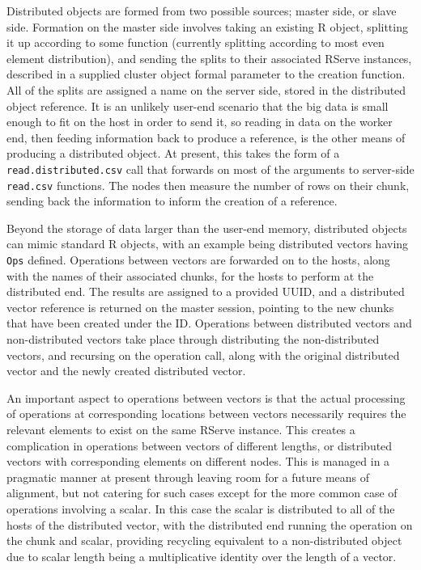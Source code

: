 \documentclass[a4paper,10pt]{article}
\begin{document}
Distributed objects are formed from two possible sources; master side, or slave
side.  
Formation on the master side involves taking an existing R object,
splitting it up according to some function (currently splitting according to
most even element distribution), and sending the splits to their associated
RServe instances, described in a supplied cluster object formal parameter to
the creation function.  
All of the splits are assigned a name on the server side, stored in the
distributed object reference.  
It is an unlikely user-end scenario that the big data is small enough to fit on
the host in order to send it, so reading in data on the worker end, then
feeding information back to produce a reference, is the other means of
producing a distributed object.  
At present, this takes the form of a \texttt{read.distributed.csv} call that
forwards on most of the arguments to server-side \texttt{read.csv} functions.
The nodes then measure the number of rows on their chunk, sending back the
information to inform the creation of a reference.

Beyond the storage of data larger than the user-end memory, distributed objects
can mimic standard R objects, with an example being distributed vectors having
\texttt{Ops} defined.  
Operations between vectors are forwarded on to the hosts, along with the names
of their associated chunks, for the hosts to perform at the distributed end.
The results are assigned to a provided UUID, and a distributed vector reference
is returned on the master session, pointing to the new chunks that have been
created under the ID.  
Operations between distributed vectors and non-distributed vectors take place
through distributing the non-distributed vectors, and recursing on the
operation call, along with the original distributed vector and the newly
created distributed vector.

An important aspect to operations between vectors is that the actual processing
of operations at corresponding locations between vectors necessarily requires
the relevant elements to exist on the same RServe instance.  
This creates a complication in operations between vectors of different lengths,
or distributed vectors with corresponding elements on different nodes.  
This is managed in a pragmatic manner at present through leaving room for a
future means of alignment, but not catering for such cases except for the more
common case of operations involving a scalar.  
In this case the scalar is distributed to all of the hosts of the distributed
vector, with the distributed end running the operation on the chunk and scalar,
providing recycling equivalent to a non-distributed object due to scalar length
being a multiplicative identity over the length of a vector.
\end{document}
